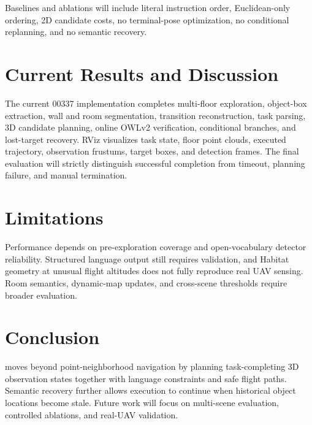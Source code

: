 \documentclass[11pt]{article}
\begin{document}
Baselines and ablations will include literal instruction order, Euclidean-only ordering, 2D candidate costs, no terminal-pose optimization, no conditional replanning, and no semantic recovery. 

\section{Current Results and Discussion}
The current 00337 implementation completes multi-floor exploration, object-box extraction, wall and room segmentation, transition reconstruction, task parsing, 3D candidate planning, online OWLv2 verification, conditional branches, and lost-target recovery. RViz visualizes task state, floor point clouds, executed trajectory, observation frustums, target boxes, and detection frames. The final evaluation will strictly distinguish successful completion from timeout, planning failure, and manual termination. 

\section{Limitations}
Performance depends on pre-exploration coverage and open-vocabulary detector reliability. Structured language output still requires validation, and Habitat geometry at unusual flight altitudes does not fully reproduce real UAV sensing. Room semantics, dynamic-map updates, and cross-scene thresholds require broader evaluation.

\section{Conclusion}
\systemname moves beyond point-neighborhood navigation by planning task-completing 3D observation states together with language constraints and safe flight paths. Semantic recovery further allows execution to continue when historical object locations become stale. Future work will focus on multi-scene evaluation, controlled ablations, and real-UAV validation.

\printbibliography
\end{document}
